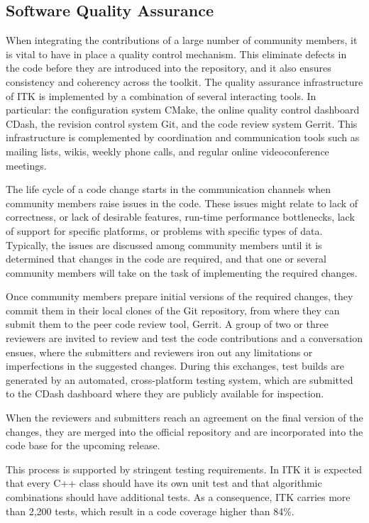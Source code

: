 \documentclass{frontiersENG} %
\begin{document}
\subsection{Software Quality Assurance}

When integrating the contributions of a large number of community members, it
is vital to have in place a quality control mechanism. This
eliminate defects in the code before they are introduced into the repository, and
it also ensures consistency and coherency across the toolkit.
The quality assurance infrastructure of ITK is implemented by a combination
of several interacting tools. In particular: the configuration system CMake,
the online quality control dashboard CDash, the revision control system Git,
and the code review system Gerrit. This infrastructure is complemented by
coordination and communication tools such as mailing lists, wikis,
weekly phone calls, and regular online videoconference meetings.

The life cycle of a code change starts in the communication channels when
community members raise issues in the code. These issues might relate to lack
of correctness, or lack of desirable features, run-time performance
bottlenecks, lack of support for specific platforms, or
problems with specific types of data. Typically, the issues are discussed among
community members until it is determined that changes in the code are required,
and that one or several community members will take on the task of
implementing the required changes.

Once community members prepare initial versions of the required changes, they
commit them in their local clones of the Git repository, from where they can
submit them to the peer code review tool, Gerrit. A group of two or three reviewers
are invited to review and test the code contributions and a conversation
ensues, where the submitters and reviewers iron out any limitations or
imperfections in the suggested changes. During this exchanges, test builds are
generated by an automated, cross-platform testing system, which are submitted to the CDash
dashboard where they are publicly available for inspection.

When the reviewers and submitters reach an agreement on the final version of
the changes, they are merged into the official repository and are incorporated
into the code base for the upcoming release.

This process is supported by stringent testing requirements. In ITK it is
expected that every C++ class should have its own unit test and that
algorithmic combinations should have additional tests. As a consequence, ITK
carries more than 2,200 tests, which result in a code coverage higher than 84\%.
\end{document}
